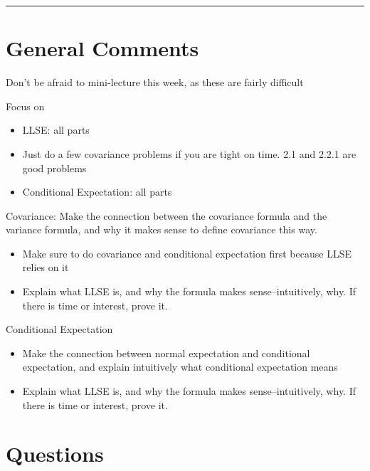 \documentclass{exam}
\title{}
\date{LLSE, Covariance, Conditional Expectation, and Markov Chains}
\begin{document}
\maketitle
\rule{\textwidth}{0.15em}
\fontsize{12}{15}\selectfont
\thispagestyle{empty}


\section{General Comments}
\begin{questions}
\item Don't be afraid to mini-lecture this week, as these are fairly difficult 
\item Focus on
\begin{itemize}
\item LLSE: all parts
\item Just do a few covariance problems if you are tight on time. 2.1 and 2.2.1 are good problems
\item Conditional Expectation: all parts
\end{itemize}
\item Covariance: Make the connection between the covariance formula and the variance formula, and why it makes sense to define covariance this way.
\begin{itemize}
\item Make sure to do covariance and conditional expectation first because LLSE relies on it
\item Explain what LLSE is, and why the formula makes sense--intuitively, why. If there is time or interest, prove it.
\end{itemize}

\item Conditional Expectation
\begin{itemize}
\item Make the connection between normal expectation and conditional expectation, and explain intuitively what conditional expectation means
\item Explain what LLSE is, and why the formula makes sense--intuitively, why. If there is time or interest, prove it.
\end{itemize}

\end{questions}

\section{Questions}
\end{document}
